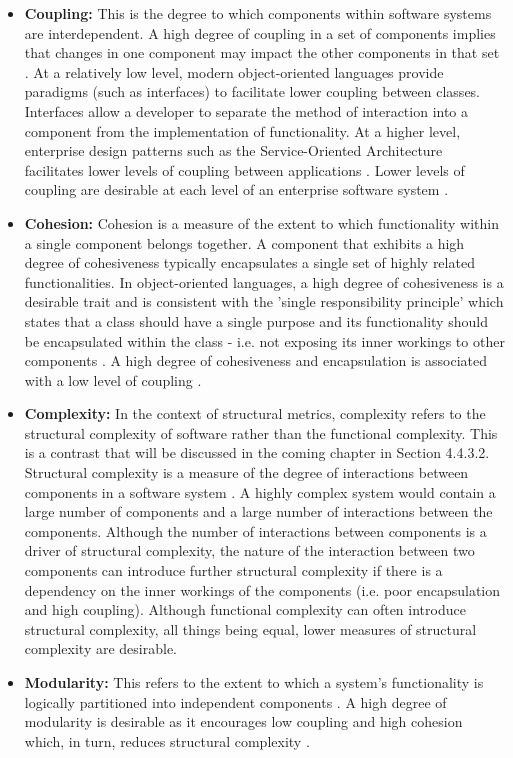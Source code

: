 \begin{itemize}
\item \textbf{Coupling:} This is the degree to which components within software systems are interdependent. A high degree of coupling in a set of components implies that changes in one component may impact the other components in that set \citep{parnas1972criteria}. At a relatively low level, modern object-oriented languages provide paradigms (such as interfaces) to facilitate lower coupling between classes. Interfaces allow a developer to separate the method of interaction into a component from the implementation of functionality. At a higher level, enterprise design patterns such as the Service-Oriented Architecture facilitates lower levels of coupling between applications \citep{jamshidi2018microservices}. Lower levels of coupling are desirable at each level of an enterprise software system \citep{chidamber1998managerial, pressman2005software}.

\item \textbf{Cohesion:} Cohesion is a measure of the extent to which functionality within a single component belongs together. A component that exhibits a high degree of cohesiveness typically encapsulates a single set of highly related functionalities. In object-oriented languages, a high degree of cohesiveness is a desirable trait and is consistent with the 'single responsibility principle' which states that a class should have a single purpose and its functionality should be encapsulated within the class - i.e. not exposing its inner workings to other components \citep{fenton2014software}. A high degree of cohesiveness and encapsulation is associated with a low level of coupling \citep{chidamber1998managerial}.

\item \textbf{Complexity:} In the context of structural metrics, complexity refers to the structural complexity of software rather than the functional complexity. This is a contrast that will be discussed in the coming chapter in Section 4.4.3.2. Structural complexity is a measure of the degree of interactions between components in a software system \citep{fenton2014software}. A highly complex system would contain a large number of components and a large number of interactions between the components. Although the number of interactions between components is a driver of structural complexity, the nature of the interaction between two components can introduce further structural complexity if there is a dependency on the inner workings of the components (i.e. poor encapsulation and high coupling). Although functional complexity can often introduce structural complexity, all things being equal, lower measures of structural complexity are desirable.

\item \textbf{Modularity:} This refers to the extent to which a system's functionality is logically partitioned into independent components \citep{parnas1972criteria}. A high degree of modularity is desirable as it encourages low coupling and high cohesion which, in turn, reduces structural complexity \citep{parnas1972criteria, sullivan2001structure}.
\end{itemize}

